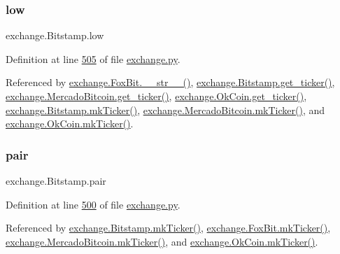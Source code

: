 \subsubsection{\texorpdfstring{low}{low}}
{\footnotesize\ttfamily exchange.\+Bitstamp.\+low}



Definition at line \hyperlink{exchange_8py_source_l00505}{505} of file \hyperlink{exchange_8py_source}{exchange.\+py}.



Referenced by \hyperlink{exchange_8py_source_l00610}{exchange.\+Fox\+Bit.\+\_\+\+\_\+str\+\_\+\+\_\+()}, \hyperlink{exchange_8py_source_l00511}{exchange.\+Bitstamp.\+get\+\_\+ticker()}, \hyperlink{exchange_8py_source_l00651}{exchange.\+Mercado\+Bitcoin.\+get\+\_\+ticker()}, \hyperlink{exchange_8py_source_l00716}{exchange.\+Ok\+Coin.\+get\+\_\+ticker()}, \hyperlink{exchange_8py_source_l00525}{exchange.\+Bitstamp.\+mk\+Ticker()}, \hyperlink{exchange_8py_source_l00665}{exchange.\+Mercado\+Bitcoin.\+mk\+Ticker()}, and \hyperlink{exchange_8py_source_l00730}{exchange.\+Ok\+Coin.\+mk\+Ticker()}.

\mbox{\label{classexchange_1_1_bitstamp_adf1f8e926f0cedb79bf57ab2dfa31776}} 
\subsubsection{\texorpdfstring{pair}{pair}}
{\footnotesize\ttfamily exchange.\+Bitstamp.\+pair}



Definition at line \hyperlink{exchange_8py_source_l00500}{500} of file \hyperlink{exchange_8py_source}{exchange.\+py}.



Referenced by \hyperlink{exchange_8py_source_l00525}{exchange.\+Bitstamp.\+mk\+Ticker()}, \hyperlink{exchange_8py_source_l00584}{exchange.\+Fox\+Bit.\+mk\+Ticker()}, \hyperlink{exchange_8py_source_l00665}{exchange.\+Mercado\+Bitcoin.\+mk\+Ticker()}, and \hyperlink{exchange_8py_source_l00730}{exchange.\+Ok\+Coin.\+mk\+Ticker()}.

\mbox{\label{classexchange_1_1_bitstamp_ae5bc1532848b36cd9ac5e46763f4ee14}} 
